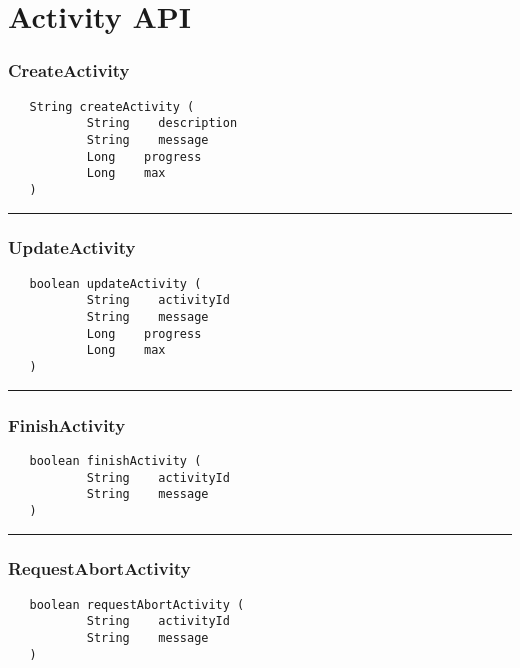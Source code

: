 \chapter{Activity API}

\subsection{CreateActivity}
\label{Api:CreateActivity}
\begin{verbatim}
   String createActivity (
           String    description
           String    message
           Long    progress
           Long    max
   )
\end{verbatim}



\rule{15cm}{2pt}
\subsection{UpdateActivity}
\label{Api:UpdateActivity}
\begin{verbatim}
   boolean updateActivity (
           String    activityId
           String    message
           Long    progress
           Long    max
   )
\end{verbatim}



\rule{15cm}{2pt}
\subsection{FinishActivity}
\label{Api:FinishActivity}
\begin{verbatim}
   boolean finishActivity (
           String    activityId
           String    message
   )
\end{verbatim}



\rule{15cm}{2pt}
\subsection{RequestAbortActivity}
\label{Api:RequestAbortActivity}
\begin{verbatim}
   boolean requestAbortActivity (
           String    activityId
           String    message
   )
\end{verbatim}



